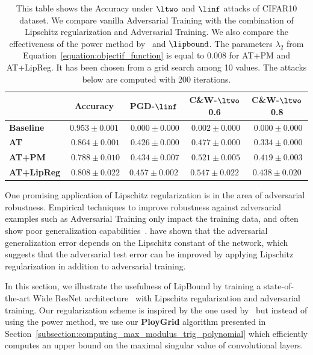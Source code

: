 \begin{table}[t]
  \centering
  \caption{This table shows the Accuracy under $\ltwo$ and $\linf$ attacks of CIFAR10 dataset. We compare vanilla Adversarial Training with the combination of Lipschitz regularization and Adversarial Training. We also compare the effectiveness of the power method by~\citet{farnia2018generalizable} and $\lipbound$. The parameters $\lambda_2$ from Equation~\ref{equation:objectif_function} is equal to $0.008$ for AT+PM and AT+LipReg. It has been chosen from a grid search among 10 values. The attacks below are computed with 200 iterations. }
    \begin{tabular}{lcccc}
    \toprule
      & \textbf{Accuracy} & \textbf{PGD-$\linf$} & \textbf{C\&W-$\ltwo$ 0.6} & \textbf{C\&W-$\ltwo$ 0.8} \\
    \midrule
    \textbf{Baseline} & $\mathbf{0.953}\pm0.001$ & $\phantom{.}0.000\pm0.000$ & $\phantom{.}0.002\pm0.000$ & $\phantom{.}0.000\pm0.000$ \\
    \textbf{AT} & $\phantom{.}0.864\pm0.001$ & $\phantom{.}0.426\pm0.000$ & $\phantom{.}0.477\pm0.000$ & $\phantom{.}0.334\pm0.000$ \\
    \textbf{AT+PM} & $\phantom{.}0.788\pm0.010$ & $\phantom{.}0.434\pm0.007$ & $\phantom{.}0.521\pm0.005$	 & $\phantom{.}0.419\pm0.003$ \\
    \textbf{AT+LipReg} & $\phantom{.}0.808\pm0.022$ & $\mathbf{0.457}\pm0.002$ & $\mathbf{0.547}\pm0.022$ & $\mathbf{0.438}\pm0.020$ \\
    \bottomrule
    \end{tabular}%
  \label{tab:table_cifar10_robustness}%
\end{table}%

One promising application of Lipschitz regularization is in the area of adversarial robustness.
Empirical techniques to improve robustness against adversarial examples such as Adversarial Training only impact the training data,  and often show poor generalization capabilities~\cite{schmidt2018adversarially}. 
\citet{farnia2018generalizable} have shown that the adversarial generalization error depends on the Lipschitz constant of the network, which suggests that the adversarial test error can be improved by applying Lipschitz regularization in addition to adversarial training. 

In this section, we illustrate the usefulness of LipBound by training a state-of-the-art Wide ResNet architecture~\cite{zagoruyko2016wide} with Lipschitz regularization and adversarial training.
Our regularization scheme is inspired by the one used by~\citet{yoshida2017spectral} but instead of using the power method, we use our \textbf{PloyGrid} algorithm presented in Section~\ref{subsection:computing_max_modulus_trig_polynomial} which efficiently computes an upper bound on the maximal singular value of convolutional layers. 

